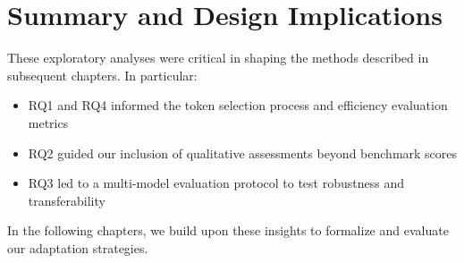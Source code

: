 \section{Summary and Design Implications}
\label{sec:exploration_summary}

These exploratory analyses were critical in shaping the methods described in subsequent chapters. In particular:
\begin{itemize}
    \item RQ1 and RQ4 informed the token selection process and efficiency evaluation metrics
    \item RQ2 guided our inclusion of qualitative assessments beyond benchmark scores
    \item RQ3 led to a multi-model evaluation protocol to test robustness and transferability
\end{itemize}

In the following chapters, we build upon these insights to formalize and evaluate our adaptation strategies.
